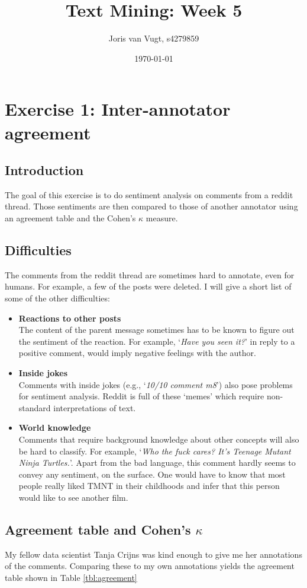 \documentclass{article}
\title{Text Mining: Week 5}
\date{\today}
\author{Joris van Vugt, s4279859}
\begin{document}
\maketitle
\section{Exercise 1: Inter-annotator agreement}
\subsection{Introduction}
The goal of this exercise is to do sentiment analysis on comments from a reddit thread. Those sentiments are then compared to those of another annotator using an agreement table and the Cohen's $\kappa$ measure.

\subsection{Difficulties}
The comments from the reddit thread are sometimes hard to annotate, even for humans. For example, a few of the posts were deleted. I will give a short list of some of the other difficulties:
\begin{itemize}
\item \textbf{Reactions to other posts} \\ 
The content of the parent message sometimes has to be known to figure out the sentiment of the reaction. For example, `\emph{Have you seen it?}' in reply to a positive comment, would imply negative feelings with the author.
\item \textbf{Inside jokes} \\
Comments with inside jokes (e.g., `\emph{10/10 comment m8}') also pose problems for sentiment analysis. Reddit is full of these `memes' which require non-standard interpretations of text.
\item \textbf{World knowledge} \\
Comments that require background knowledge about other concepts will also be hard to classify. For example, `\emph{Who the fuck cares? It's Teenage Mutant Ninja Turtles.}'. Apart from the bad language, this comment hardly seems to convey any sentiment, on the surface. One would have to know that most people really liked TMNT in their childhoods and infer that this person would like to see another film.
\end{itemize}

\subsection{Agreement table and Cohen's $\kappa$}
My fellow data scientist Tanja Crijns was kind enough to give me her annotations of the comments. Comparing these to my own annotations yields the agreement table shown in Table \ref{tbl:agreement}
\end{document}

